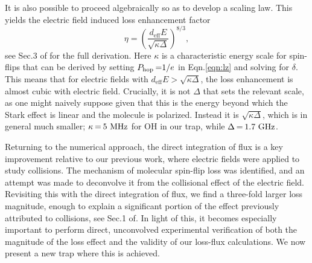 \documentclass[%
 reprint,
 amsmath,amssymb,
 aps,
prl,
]{revtex4-1}
\newcommand{\epb}{{$\vec{E}\s {\perp}\s\vec{B}$}}
\newcommand{\s}{{\nobreak\hspace{.2em}}}
\begin{document}
It is also possible to proceed algebraically so as to develop a scaling law.
This yields the electric field induced loss enhancement factor
\begin{equation}
\eta= \left(\frac{d_\text{eff}E}{\sqrt{\kappa\Delta}}\right)^{8/3},
\end{equation}
see Sec.\s3 of\s\cite{ssm} for the full derivation. 
Here $\kappa$ is a characteristic energy scale for spin-flips that can be derived by setting $P_\text{hop}\s {=}1/e$ in Eqn.\s\ref{eqn:lz} and solving for $\delta$. 
This means that for electric fields with $d_\text{eff}E>\sqrt{\kappa\Delta}$, the loss enhancement is almost cubic with electric field.
Crucially, it is not $\Delta$ that sets the relevant scale, as one might naively suppose given that this is the energy beyond which the Stark effect is linear and the molecule is polarized.
Instead it is $\sqrt{\kappa\Delta}$, which is in general much smaller; $\kappa\s {=}\s 5\text{ MHz}$ for OH in our trap, while $\Delta\s {=}\s1.7\text{ GHz}$.

Returning to the numerical approach, the direct integration of flux is a key improvement relative to our previous work\s\cite{Stuhl2013}, where electric fields were applied to study collisions.
The mechanism of molecular spin-flip loss was identified, and an attempt was made to deconvolve it from the collisional effect of the electric field. 
Revisiting this with the direct integration of flux, we find a three-fold larger loss magnitude, enough to explain a significant portion of the effect previously attributed to collisions, see Sec.\s1 of\s\cite{ssm}.
In light of this, it becomes especially important to perform direct, unconvolved experimental verification of both the magnitude of the loss effect and the validity of our loss-flux calculations.
We now present a new trap where this is achieved.
\end{document}
